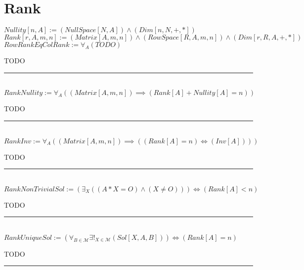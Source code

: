 \documentclass{book}
\newcommand{\abr}{:=}
\newcommand{\pr}[1]{\left(#1\right)}
\begin{document}
\section{Rank}
$Nullity[n, A] \abr (NullSpace[N, A]) \land (Dim[n, N, +, *])$ \\
$Rank[r, A, m, n] \abr (Matrix[A, m, n]) \land (RowSpace[R, A, m, n]) \land (Dim[r, R, A, +, *])$ \\

$RowRankEqColRank \abr \forall_{A}(TODO)$
\begin{enumerate}
  \lit TODO
\end{enumerate} \vspace{.75mm} \hrule \vspace{.75mm} \ \\ 

$RankNullity \abr \forall_{A}\pr{(Matrix[A, m, n]) \implies (Rank[A] + Nullity[A] = n)}$
\begin{enumerate}
  \lit TODO
\end{enumerate} \vspace{.75mm} \hrule \vspace{.75mm} \ \\ 

$RankInv \abr \forall_{A}\pr{(Matrix[A, m, n]) \implies \pr{(Rank[A] = n) \iff (Inv[A])}}$
\begin{enumerate}
  \lit TODO
\end{enumerate} \vspace{.75mm} \hrule \vspace{.75mm} \ \\ 

$RankNonTrivialSol \abr \pr{\exists_{X}\pr{(A * X = O) \land (X \neq O)}} \iff (Rank[A] < n)$
\begin{enumerate}
  \lit TODO
\end{enumerate} \vspace{.75mm} \hrule \vspace{.75mm} \ \\ 

$RankUniqueSol \abr \pr{\forall_{B \in \mathcal{M}} \exists!_{X \in \mathcal{M}}(Sol[X, A, B])} \iff (Rank[A] = n)$
\begin{enumerate}
  \lit TODO
\end{enumerate} \vspace{.75mm} \hrule \vspace{.75mm} \ \\ 
\end{document}
